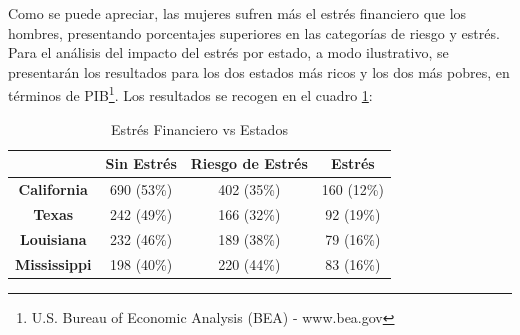 \documentclass[a4paper, 11pt]{article}
\begin{document}
Como se puede apreciar, las mujeres sufren más el estrés financiero que los 
hombres, presentando porcentajes superiores en las categorías de riesgo y estrés. 
Para el análisis del impacto del estrés por estado, a modo ilustrativo, se presentarán
los resultados para los dos estados más ricos y los dos más pobres, 
en términos de PIB\footnote{U.S. Bureau of Economic Analysis (BEA) 
- www.bea.gov}.
Los resultados se recogen en el cuadro \ref{tab:stress_vs_states}:

\begin{table}[ht]
\centering
\begin{tabular}{cccc }
\toprule
 & \textbf{Sin Estrés} & \textbf{Riesgo de Estrés} & \textbf{Estrés}\\
\midrule
\textbf{California} & 690 (53\%) & 402 (35\%)& 160 (12\%)\\
\textbf{Texas} & 242 (49\%)& 166 (32\%)& 92 (19\%)\\
\hline
\textbf{Louisiana} & 232 (46\%) & 189 (38\%)& 79 (16\%)\\
\textbf{Mississippi} & 198 (40\%)& 220 (44\%)& 83 (16\%)\\
\bottomrule
\end{tabular}
\caption{Estrés Financiero vs Estados}
\label{tab:stress_vs_states}
\end{table}
\end{document}
